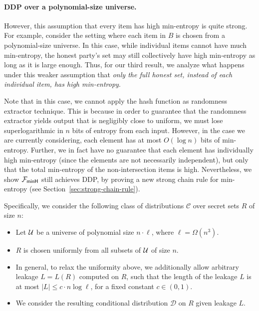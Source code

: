 \paragraph{DDP over a polynomial-size universe.}
 However, this assumption that every item has high min-entropy is quite strong.  For example, consider the setting where each item in $B$ is chosen from a polynomial-size universe. In this case, while individual items cannot have much min-entropy, the honest party's set may still collectively have high min-entropy as long as it is large enough.  Thus, for our third result, we analyze what happens under this weaker assumption that {\em only the full honest set, instead of each individual item, has high min-entropy}.  
 
 Note that in this case, we cannot apply the hash function as randomness extractor technique. This is because in order to guarantee that the randomness extractor yields output that is negligibly close to uniform, we must lose superlogarithmic in $n$ bits of entropy from each input. However, in the case we are currently considering, each element has at most $O(\log n)$ bits of min-entropy. Further, we in fact have no guarantee that each element has individually high min-entropy (since the elements are not necessarily independent), but only that the total min-entropy of the non-intersection items is high.
 Nevertheless, we show ${\mathcal{F}_\mathsf{minH}}$ still achieves DDP,
 by proving a new strong chain rule for min-entropy (see Section~\ref{sec:strong-chain-rule}).  
 
 Specifically, we consider the following class of distributions
 $\mathcal{C}$
 over secret sets $R$ of size $n$:
 \begin{itemize}
 \item Let $\mathcal{U}$ be a universe of polynomial size $n \cdot \ell$, where $\ell = \Omega(n^3)$.
 \item $R$ is chosen uniformly from all subsets of $\mathcal{U}$ of size $n$.
 \item In general, to relax the uniformity above, we additionally allow arbitrary leakage $L = L(R)$ computed on $R$, such that
the length of the leakage $L$ is at most
 $|L| \leq c \cdot n \log \ell$,
 for a fixed constant $c \in (0,1)$.
 \item We consider the resulting conditional distribution 
 $\mathcal{D}$ on $R$ given leakage $L$.
 \end{itemize}
 

